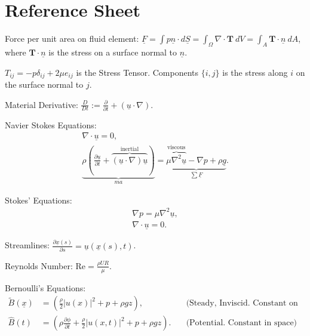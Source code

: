 \documentclass[11pt,a4paper]{article}
\begin{document}
	\maketitle
	\tableofcontents
	
	\section{Reference Sheet}
	Force per unit area on fluid element: $\underline{F} = \int p \underline{n}\cdot d\underline{S} = \int_\Omega\nabla \cdot \mathbf{T} \ dV = \int_A \mathbf{T}\cdot \underline{n}\ dA$, where $\mathbf{T}\cdot \underline{n}$ is the stress on a surface normal to $\underline{n}$.
	
	$T_{ij} = -p\delta_{ij} + 2\mu e_{ij}$ is the Stress Tensor. Components $\{i,j\}$ is the stress along $i$ on the surface normal to $j$.
		
	Material Derivative: ${\frac{D}{Dt}} := {\frac{\partial }{\partial t} + (\underline{u}\cdot \nabla )}$.

	Navier Stokes Equations:
	\begin{subequations}
		\label{NavierStokes}
		\begin{align}
			\nabla \cdot \underline{u} = 0,\\
			\underbrace{\rho\left( \frac{\partial \underline{u}}{\partial t} + \overbrace{(\underline{u}\cdot \nabla) \underline{u}}^\text{inertial} \right)}_{ma} = \underbrace{\overbrace{\mu\nabla ^2 \underline{u}}^\text{viscous} - \nabla p + \rho \underline{g}}_{\sum \underline{F}}.
		\end{align}
	\end{subequations}
	
	Stokes' Equations:
	\begin{subequations}
		\label{Stokes}
		\begin{align}
			\nabla p = \mu \nabla ^2 \underline{u},\\
			\nabla \cdot \underline{u} = 0.
		\end{align}
	\end{subequations}
	
	Streamlines: $\frac{\partial \underline{x}(s)}{\partial s} = \underline{u}(\underline{x}(s),t)$.
	
	Reynolds Number: $\text{Re} = \frac{\rho UR}{\mu}$.
	
	Bernoulli's Equations:
	\begin{subequations}\label{Bernoulli}
		\begin{align}
			\tilde{B}(\underline{x}) &= \left( \frac{\rho}{2} |u(x)|^2 + p  + \rho gz \right),\quad&\text{(Steady, Inviscid. Constant on streamlines)} \label{Bernoulli1}\\
			\hat{B}(t) &= \left( {\rho \frac{\partial \phi}{\partial t}} + \frac{\rho}{2} |u(x,t)|^2 + p + \rho gz \right).\quad&\text{(Potential. Constant in space)} \label{Bernoulli2}
		\end{align}
	\end{subequations}
	
\end{document}
